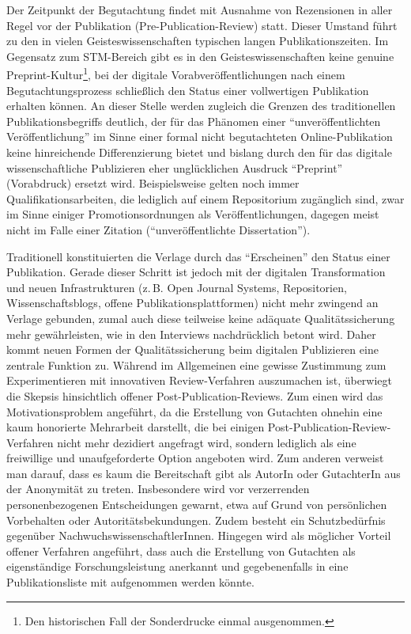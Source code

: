 \documentclass[a4paper,
fontsize=11pt,
oneside,
numbers=noperiodatend,
parskip=half-,
bibliography=totoc,
final
]{scrartcl}
\begin{document}
Der Zeitpunkt der Begutachtung findet mit Ausnahme von Rezensionen in
aller Regel vor der Publikation (Pre-Publication-Review) statt. Dieser
Umstand führt zu den in vielen Geisteswissenschaften typischen langen
Publikationszeiten. Im Gegensatz zum STM-Bereich gibt es in den
Geisteswissenschaften keine genuine Preprint-Kultur\footnote{Den
  historischen Fall der Sonderdrucke einmal ausgenommen.}, bei der
digitale Vorabveröffentlichungen nach einem Begutachtungsprozess
schließlich den Status einer vollwertigen Publikation erhalten können.
An dieser Stelle werden zugleich die Grenzen des traditionellen
Publikationsbegriffs deutlich, der für das Phänomen einer
\enquote{unveröffentlichten Veröffentlichung} im Sinne einer formal
nicht begutachteten Online-Publikation keine hinreichende
Differenzierung bietet und bislang durch den für das digitale
wissenschaftliche Publizieren eher unglücklichen Ausdruck
\enquote{Preprint} (Vorabdruck) ersetzt wird. Beispielsweise gelten noch
immer Qualifikationsarbeiten, die lediglich auf einem Repositorium
zugänglich sind, zwar im Sinne einiger Promotionsordnungen als
Veröffentlichungen, dagegen meist nicht im Falle einer Zitation
(\enquote{unveröffentlichte Dissertation}).

Traditionell konstituierten die Verlage durch das \enquote{Erscheinen}
den Status einer Publikation. Gerade dieser Schritt ist jedoch mit der
digitalen Transformation und neuen Infrastrukturen (z.\,B. Open Journal
Systems, Repositorien, Wissenschaftsblogs, offene
Publikationsplattformen) nicht mehr zwingend an Verlage gebunden, zumal
auch diese teilweise keine adäquate Qualitätssicherung mehr
gewährleisten, wie in den Interviews nachdrücklich betont wird. Daher
kommt neuen Formen der Qualitätssicherung beim digitalen Publizieren
eine zentrale Funktion zu. Während im Allgemeinen eine gewisse
Zustimmung zum Experimentieren mit innovativen Review-Verfahren
auszumachen ist, überwiegt die Skepsis hinsichtlich offener
Post-Publication-Reviews. Zum einen wird das Motivationsproblem
angeführt, da die Erstellung von Gutachten ohnehin eine kaum honorierte
Mehrarbeit darstellt, die bei einigen Post-Publication-Review-Verfahren
nicht mehr dezidiert angefragt wird, sondern lediglich als eine
freiwillige und unaufgeforderte Option angeboten wird. Zum anderen
verweist man darauf, dass es kaum die Bereitschaft gibt als AutorIn oder
GutachterIn aus der Anonymität zu treten. Insbesondere wird vor
verzerrenden personenbezogenen Entscheidungen gewarnt, etwa auf Grund
von persönlichen Vorbehalten oder Autoritätsbekundungen. Zudem besteht
ein Schutzbedürfnis gegenüber NachwuchswissenschaftlerInnen. Hingegen
wird als möglicher Vorteil offener Verfahren angeführt, dass auch die
Erstellung von Gutachten als eigenständige Forschungsleistung anerkannt
und gegebenenfalls in eine Publikationsliste mit aufgenommen werden
könnte.
\end{document}
